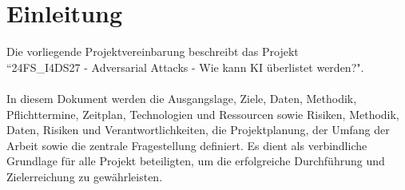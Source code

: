 \section{Einleitung}
Die vorliegende Projektvereinbarung beschreibt das Projekt \\ 
``24FS\_I4DS27 - Adversarial Attacks - Wie kann KI überlistet werden?". \\\\
In diesem Dokument werden die Ausgangslage, Ziele, Daten, Methodik, Pflichttermine, Zeitplan, Technologien und Ressourcen sowie Risiken, Methodik, Daten, Risiken und Verantwortlichkeiten, die Projektplanung, der Umfang der Arbeit sowie die zentrale Fragestellung definiert. Es dient als verbindliche Grundlage für alle Projekt beteiligten, um die erfolgreiche Durchführung und Zielerreichung zu gewährleisten.
